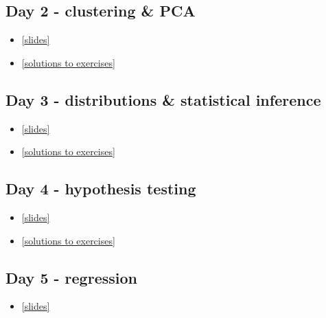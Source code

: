 \documentclass[
]{book}
\providecommand{\tightlist}{%
  \setlength{\itemsep}{0pt}\setlength{\parskip}{0pt}}
\begin{document}
\hypertarget{day-2---clustering-pca}{%
\subsection{Day 2 - clustering \& PCA}\label{day-2---clustering-pca}}

\begin{itemize}
\tightlist
\item
  \href{./slides/GKBioinfo_week1_day2.pdf}{{[}slides{]}}
\item
  \href{./slides/solution_day2.Rmd}{{[}solutions to exercises{]}}
\end{itemize}

\hypertarget{day-3---distributions-statistical-inference}{%
\subsection{Day 3 - distributions \& statistical inference}\label{day-3---distributions-statistical-inference}}

\begin{itemize}
\tightlist
\item
  \href{./slides/GKBioinfo_week1_day3.pdf}{{[}slides{]}}
\item
  \href{./slides/solution_day3.Rmd}{{[}solutions to exercises{]}}
\end{itemize}

\hypertarget{day-4---hypothesis-testing}{%
\subsection{Day 4 - hypothesis testing}\label{day-4---hypothesis-testing}}

\begin{itemize}
\tightlist
\item
  \href{./slides/GKBioinfo_week1_day4.pdf}{{[}slides{]}}
\item
  \href{./slides/solution_day4.Rmd}{{[}solutions to exercises{]}}
\end{itemize}

\hypertarget{day-5---regression}{%
\subsection{Day 5 - regression}\label{day-5---regression}}

\begin{itemize}
\tightlist
\item
  \href{./slides/GKBioinfo_week1_day5.pdf}{{[}slides{]}}
\end{itemize}
\end{document}
